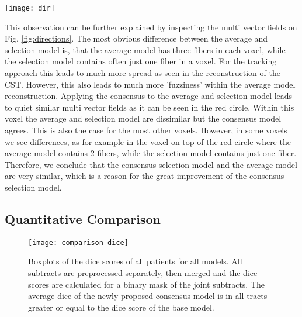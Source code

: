 \begin{figure*}[h]
	\centering
	\texttt{[image: dir]}
	\caption{Reconstructed fiber orientations of the different models, the
	red box in the left image denotes the position within the brain. Top row
shows models without consensus bootstrapping, bottom row with consensus
bootstrapping. Left: Averaging model. Right: selection model. Both consensus
models coincide in most voxels very well, although the base models differ as it
is visible in the red circled voxel.}
	\label{fig:directions}
\end{figure*}

This observation can be further explained by inspecting the multi vector fields
on Fig. \ref{fig:directions}. The most obvious difference between the average and
selection model is, that the average model has three fibers in
each voxel, while the selection model contains often just one fiber in a voxel.
For the tracking approach this leads to much more spread as seen in the
reconstruction of the CST. However, this also leads to much more 'fuzziness'
within the average model reconstruction. 
Applying the consensus to the average
and selection model leads to quiet similar multi vector fields as it can be seen
in the red circle. Within this voxel the average and selection model are
dissimilar but the consensus model agrees. This is also the case for the most
other voxels. However, in some voxels we see differences, as for example in the
voxel on top of the red circle where the average model contains $2$ fibers,
while the selection model contains just one fiber. Therefore, we conclude that
the consensus selection model and the average model are very similar, which is a
reason for the great improvement of the consensus selection model. 

\subsection{Quantitative Comparison}
\begin{figure}[t]
	\centering
	\texttt{[image: comparison-dice]}
	\caption{Boxplots of the dice scores of all patients for all models. All
	subtracts are preprocessed separately, then merged and the dice scores
are calculated for a binary mask of the joint subtracts. The
average dice of the newly proposed consensus model is in all tracts greater or
equal to the dice score of the base model.}
	\label{fig:Dice}
\end{figure}

